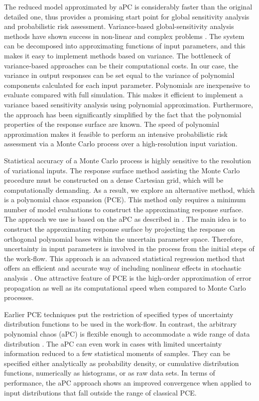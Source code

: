 The reduced model approximated by aPC is considerably faster than the original
detailed one, thus provides a promising start point for global
sensitivity analysis and probabilistic risk assessment. Variance-based global-sensitivity analysis methods have shown success in non-linear and complex problems \cite{reuter2008global}.
The system can be decomposed into approximating functions of input parameters, and this makes it easy to implement methods based on variance. The bottleneck of variance-based approaches can be their computational costs. In our case, the variance in output responses can be set equal to the variance of polynomial components calculated for each input parameter. Polynomials are inexpensive to evaluate compared with full simulation. This makes it efficient to implement a variance based sensitivity analysis using polynomial approximation. Furthermore, the approach has been significantly simplified by the fact that the polynomial properties of the response surface are known. The speed of polynomial approximation makes it feasible to perform an intensive probabilistic risk assessment via a Monte Carlo process over a high-resolution input variation. 

Statistical accuracy of a Monte Carlo process is highly sensitive to the
resolution of variational inputs. The response surface method assisting the
Monte Carlo procedure must be constructed on a dense Cartesian grid, which will
be computationally demanding. As a result, we explore an alternative method, which is a polynomial chaos expansion (PCE). This method only
requires a minimum number of model evaluations to construct the approximating response surface. The approach we use is based on the aPC as described in \cite{oladyshkin2011concept}. The main idea is to construct the approximating response surface by projecting the response on orthogonal polynomial bases within the uncertain parameter space. Therefore, uncertainty in input parameters is involved in the process from the initial steps of the work-flow. This approach is an advanced statistical regression method that offers an efficient and accurate way of including nonlinear effects in stochastic analysis \cite{Zhang_Lu_2004_JCP,foo_pcm_JCP2010, 
Fajraoui_al_2011_WRR}. One attractive
feature of PCE is the high-order approximation of error propagation as well as its computational speed \cite{oladyshkinintegrative} when compared to Monte Carlo processes.

Earlier PCE techniques put the restriction of specified types of uncertainty
distribution functions to be used in the work-flow. In contrast, the arbitrary polynomial chaos (aPC) is flexible enough to accommodate a wide range of data
distribution \cite{oladyshkin2011concept}. The aPC can even work in cases with
limited uncertainty information reduced to a few statistical moments of samples.
They can be specified either analytically as probability density, or cumulative
distribution functions, numerically as histograms, or as raw data sets. In
terms of performance, the aPC approach shows an improved convergence when applied to
input distributions that fall outside the range of classical PCE.

